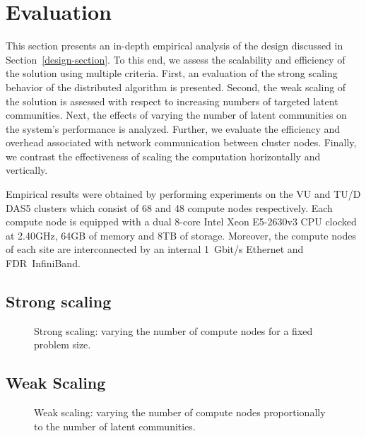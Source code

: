 \section{Evaluation}

This section presents an in-depth empirical analysis of the design discussed in
Section~\ref{design-section}. To this end, we assess the scalability and
efficiency of the solution using multiple criteria.
%
First, an evaluation of the strong scaling behavior of the distributed
algorithm is presented.
%
Second, the weak scaling of the solution is assessed with respect to increasing
numbers of targeted latent communities.
%
Next, the effects of varying the number of latent communities on the system's
performance is analyzed.
%
Further, we evaluate the efficiency and overhead associated with network
communication between cluster nodes.
%
Finally, we contrast the effectiveness of scaling the computation horizontally
and vertically.

Empirical results were obtained by performing experiments on the VU and TU/D
DAS5 clusters which consist of 68 and 48 compute nodes respectively. Each
compute node is equipped with a dual 8-core Intel Xeon E5-2630v3 CPU clocked
at 2.40GHz, 64GB of memory and 8TB of storage. Moreover, the compute nodes of
each site are interconnected by an internal 1~Gbit/s Ethernet and FDR~InfiniBand.

\subsection{Strong scaling}

\begin{figure}[ht] %
  \centering
  \caption{Strong scaling: varying the number of compute nodes for a fixed
  problem size.}
  \label{fig-strong-scaling}
\end{figure}

\subsection{Weak Scaling}

\begin{figure}[t] %
  \centering
  \caption{Weak scaling: varying the number of compute nodes proportionally to
  the number of latent communities.}
  \label{fig-weak-scaling}
\end{figure}

